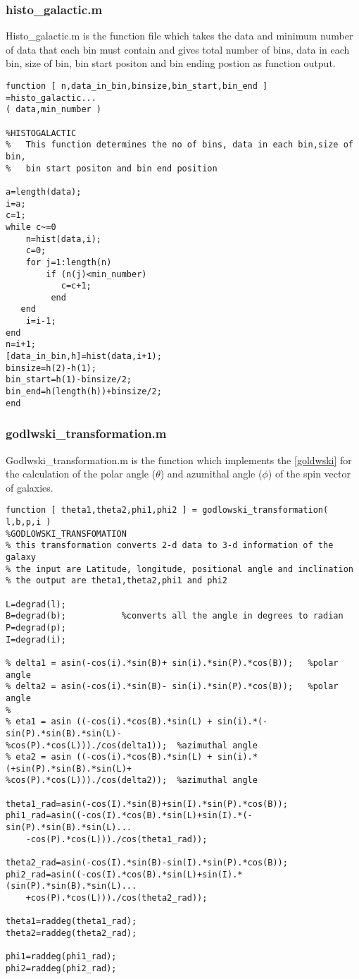 \subsubsection*{histo\_galactic.m}
Histo\_galactic.m is the function file which takes the data and minimum number of data that each bin must contain and gives total number of bins, data in each bin, size of bin, bin start positon and bin ending postion as function output.
\begin{verbatim}
function [ n,data_in_bin,binsize,bin_start,bin_end ] =histo_galactic...
( data,min_number )

%HISTOGALACTIC
%   This function determines the no of bins, data in each bin,size of bin,
%   bin start positon and bin end position

a=length(data);
i=a;
c=1;
while c~=0
    n=hist(data,i); 
    c=0;
    for j=1:length(n)
        if (n(j)<min_number)
           c=c+1;
         end         
   end
    i=i-1;
end
n=i+1;
[data_in_bin,h]=hist(data,i+1);
binsize=h(2)-h(1);
bin_start=h(1)-binsize/2;
bin_end=h(length(h))+binsize/2;
end
\end{verbatim}
\subsubsection*{godlwski\_transformation.m}
Godlwski\_transformation.m is the function which implements the \eqref{goldwski} for the calculation of the polar angle ($\theta$) and azumithal angle ($\phi$) of the spin vector of galaxies.
\begin{verbatim}
function [ theta1,theta2,phi1,phi2 ] = godlowski_transformation( l,b,p,i )
%GODLOWSKI_TRANSFOMATION 
% this transformation converts 2-d data to 3-d information of the galaxy
% the input are Latitude, longitude, positional angle and inclination
% the output are theta1,theta2,phi1 and phi2

L=degrad(l);
B=degrad(b);           %converts all the angle in degrees to radian
P=degrad(p);
I=degrad(i);

% delta1 = asin(-cos(i).*sin(B)+ sin(i).*sin(P).*cos(B));	%polar angle
% delta2 = asin(-cos(i).*sin(B)- sin(i).*sin(P).*cos(B));	%polar angle
% 
% eta1 = asin ((-cos(i).*cos(B).*sin(L) + sin(i).*(-sin(P).*sin(B).*sin(L)-
%cos(P).*cos(L)))./cos(delta1));  %azimuthal angle
% eta2 = asin ((-cos(i).*cos(B).*sin(L) + sin(i).*(+sin(P).*sin(B).*sin(L)+
%cos(P).*cos(L)))./cos(delta2));  %azimuthal angle

theta1_rad=asin(-cos(I).*sin(B)+sin(I).*sin(P).*cos(B));
phi1_rad=asin((-cos(I).*cos(B).*sin(L)+sin(I).*(-sin(P).*sin(B).*sin(L)...
    -cos(P).*cos(L)))./cos(theta1_rad));

theta2_rad=asin(-cos(I).*sin(B)-sin(I).*sin(P).*cos(B));
phi2_rad=asin((-cos(I).*cos(B).*sin(L)+sin(I).*(sin(P).*sin(B).*sin(L)...
    +cos(P).*cos(L)))./cos(theta2_rad));

theta1=raddeg(theta1_rad);
theta2=raddeg(theta2_rad);

phi1=raddeg(phi1_rad);
phi2=raddeg(phi2_rad);

\end{verbatim}
